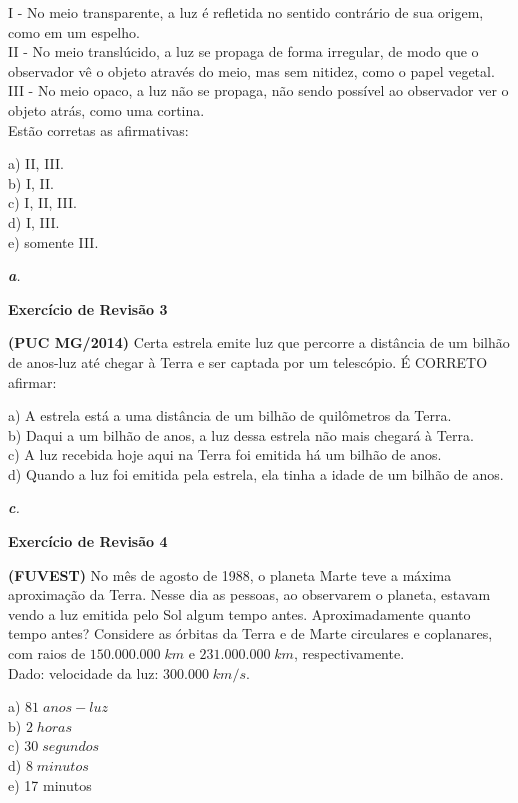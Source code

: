 \documentclass[11pt,twocolumn,oneside]{article}
\newenvironment{resposta*}
  {\bf Resposta:\\ }
  {}
\begin{document}
I - No meio transparente, a luz é refletida no sentido contrário de sua origem, como em um espelho. \\
II - No meio translúcido, a luz se propaga de forma irregular, de modo que o observador vê o objeto através do meio, mas sem nitidez, como o papel vegetal. \\
III - No meio opaco, a luz não se propaga, não sendo possível ao observador ver o objeto atrás, como uma cortina. \\
Estão corretas as afirmativas:


a) II, III. \\
b) I, II. \\
c) I, II, III. \\
d) I, III. \\
e) somente III.


\begin{resposta*}
{\it \textbf{a}.}
\end{resposta*}

\textbf{Exercício de Revisão 3}


\textbf{(PUC MG/2014)} Certa estrela emite luz que percorre a distância de um bilhão de anos-luz até chegar à Terra e ser captada por um telescópio. É CORRETO afirmar:


a)	A estrela está a uma distância de um bilhão de quilômetros da Terra. \\
b)	Daqui a um bilhão de anos, a luz dessa estrela não mais chegará à Terra. \\
c)	A luz recebida hoje aqui na Terra foi emitida há um bilhão de anos. \\
d)	Quando a luz foi emitida pela estrela, ela tinha a idade de um bilhão de anos.


\begin{resposta*}
{\it \textbf{c}.}
\end{resposta*}

\textbf{Exercício de Revisão 4}


\textbf{(FUVEST)} No mês de agosto de 1988, o planeta Marte teve a máxima aproximação da Terra. Nesse dia as pessoas, ao observarem o planeta, estavam vendo a luz emitida pelo Sol algum tempo antes. Aproximadamente quanto tempo antes? Considere as órbitas da Terra e de Marte circulares e coplanares, com raios de $150.000.000\;km$ e $231.000.000\;km$, respectivamente. \\
Dado: velocidade da luz: $300.000\;km/s$.


a) $81\;anos-luz$ \\
b) $2\;horas$ \\
c) $30\;segundos$ \\
d) $8\;minutos$ \\
e) 17 minutos
\end{document}
